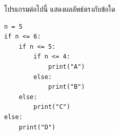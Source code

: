 \question โปรแกรมต่อไปนี้ แสดงผลลัพธ์ตรงกับข้อใด
\begin{verbatim}
n = 5
if n <= 6:
    if n <= 5:
        if n <= 4:
            print("A")
        else:
            print("B")
    else:
        print("C")
else:
    print("D")
\end{verbatim}
